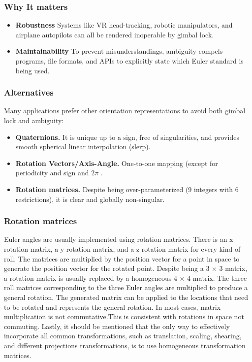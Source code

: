 \documentclass[12pt]{article}
\begin{document}
\subsubsection*{Why It matters}
\begin{itemize}
  \item \textbf{Robustness} Systems like VR head-tracking, robotic manipulators, and airplane autopilots can all be rendered inoperable by gimbal lock\cite{ref20}.
  \item \textbf{Maintainability} To prevent misunderstandings, ambiguity compels programs, file formats, and APIs to explicitly state which Euler standard is being used\cite{ref20}.
\end{itemize}

\subsubsection*{Alternatives}
Many applications prefer other orientation representations to avoid both gimbal lock and ambiguity:
\begin{itemize}
  \item \textbf{Quaternions.}  It is unique up to a sign, free of singularities, and provides smooth spherical linear interpolation (slerp)\cite{ref20}. 
  \item \textbf{Rotation Vectors/Axis-Angle.}  One-to-one mapping (except for periodicity and sign and \(2\pi\) \cite{ref20}. 
  \item \textbf{Rotation matrices.}  Despite being over-parameterized (9 integers with 6 restrictions), it is clear and globally non-singular\cite{ref20}. 
\end{itemize}

\subsubsection{Rotation matrices}
Euler angles are usually implemented using rotation matrices. There is an x rotation matrix, a y rotation matrix, and a z rotation matrix for every kind of roll. The matrices are multiplied by the position vector for a point in space to generate the position vector for the rotated point.  Despite being a 3 × 3 matrix, a rotation matrix is usually replaced by a homogeneous 4 × 4 matrix. The three roll matrices corresponding to the three Euler angles are multiplied to produce a general rotation. The generated matrix can be applied to the locations that need to be rotated and represents the general rotation. In most cases, matrix multiplication is not commutative.This is consistent with rotations in space not commuting.
 Lastly, it should be mentioned that the only way to effectively incorporate all common
transformations, such as translation, scaling, shearing, and different projections
transformations, is to use homogeneous transformation matrices\cite{ref20}.
\end{document}
